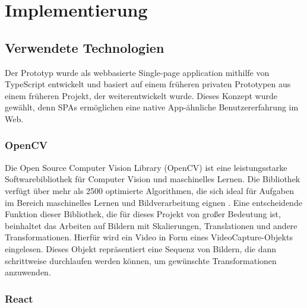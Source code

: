 \documentclass[
  ngerman,
  a4paper,  %
  twoside,  %
  bibliography=totoc,
  headsepline,
  cleardoublepage=empty,
  parskip=half,
  draft=false
]{scrbook}
\begin{document}
\chapter{Implementierung \label{chp:implementierung}}
\section{Verwendete Technologien}
Der Prototyp wurde als webbasierte Single-page application mithilfe von TypeScript entwickelt und basiert auf einem früheren privaten Prototypen aus einem früheren Projekt, der weiterentwickelt wurde. Dieses Konzept wurde gewählt, denn SPAs ermöglichen eine native App-ähnliche Benutzererfahrung im Web.
\subsection{OpenCV}
Die Open Source Computer Vision Library (OpenCV) ist eine leistungsstarke Softwarebibliothek für Computer Vision und maschinelles Lernen. Die Bibliothek verfügt über mehr als 2500 optimierte Algorithmen, die sich ideal für Aufgaben im Bereich maschinelles Lernen und Bildverarbeitung eignen \cite{opencv2023about}. Eine entscheidende Funktion dieser Bibliothek, die für dieses Projekt von großer Bedeutung ist, beinhaltet das Arbeiten auf Bildern mit Skalierungen, Translationen und andere Transformationen. Hierfür wird ein Video in Form eines VideoCapture-Objekts eingelesen. Dieses Objekt repräsentiert eine Sequenz von Bildern, die dann schrittweise durchlaufen werden können, um gewünschte Transformationen anzuwenden.


\subsection{React}
\end{document}
